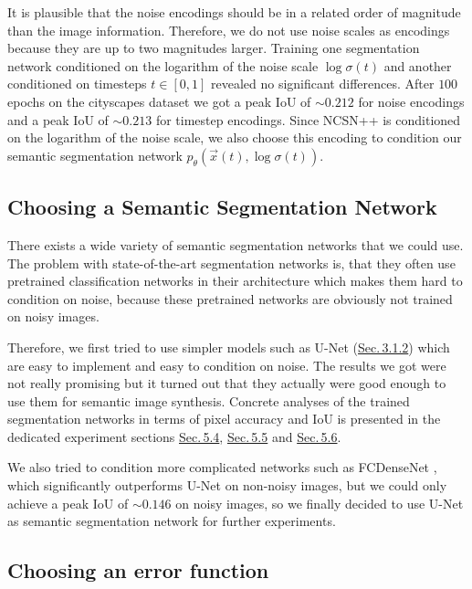 It is plausible that the noise encodings should be in a related order of magnitude than the image information. Therefore, we do not use noise scales as encodings because they are up to two magnitudes larger. Training one segmentation network conditioned on the logarithm of the noise scale $\log \sigma(t)$ and another conditioned on timesteps $t\in[0,1]$ revealed no significant differences. After $100$ epochs on the cityscapes dataset we got a peak IoU of $\sim0.212$ for noise encodings and a peak IoU of $\sim0.213$ for timestep encodings. Since NCSN++ is conditioned on the logarithm of the noise scale, we also choose this encoding to condition our semantic segmentation network $p_\theta(\vec{x}(t), \log \sigma(t))$.

\subsection{Choosing a Semantic Segmentation Network}

There exists a wide variety of semantic segmentation networks that we could use. The problem with state-of-the-art segmentation networks is, that they often use pretrained classification networks in their architecture which makes them hard to condition on noise, because these pretrained networks are obviously not trained on noisy images. 

Therefore, we first tried to use simpler models such as U-Net (\hyperref[sec:3.1.2]{Sec.\,3.1.2}) which are easy to implement and easy to condition on noise. The results we got were not really promising but it turned out that they actually were good enough to use them for semantic image synthesis. Concrete analyses of the trained segmentation networks in terms of pixel accuracy and IoU is presented in the dedicated experiment sections \hyperref[sec:5.4]{Sec.\,5.4}, \hyperref[sec:5.5]{Sec.\,5.5} and \hyperref[sec:5.6]{Sec.\,5.6}.

We also tried to condition more complicated networks such as FCDenseNet \cite{densenet}, which significantly outperforms U-Net on non-noisy images, but we could only achieve a peak IoU of $\sim0.146$ on noisy images, so we finally decided to use U-Net as semantic segmentation network for further experiments.

\subsection{Choosing an error function}

